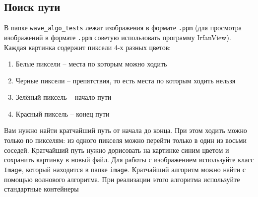 \documentclass{article}
\begin{document}
\subsection{Поиск пути}
В папке \texttt{wave\_algo\_tests} лежат изображения в формате \texttt{.ppm} (для просмотра изображений в формате \texttt{.ppm} советую использовать программу IrfanView).  Каждая картинка содержит пиксели 4-х разных цветов:
\begin{enumerate}
\item Белые пиксели -- места по которым можно ходить
\item Черные пиксели -- препятствия, то есть места по которым ходить нельзя
\item Зелёный пиксель -- начало пути
\item Красный пиксель -- конец пути
\end{enumerate}
Вам нужно найти кратчайший путь от начала до конца. При этом ходить можно только по пикселям: из одного пикселя можно перейти только в один из восьми соседей.
Кратчайший путь нужно дорисовать на картинке синим цветом и сохранить картинку в новый файл. 
Для работы с изображением используйте класс \texttt{Image}, который находится в папке \texttt{image}.
Кратчайший алгоритм можно найти с помощью волнового алгоритма. При реализации этого алгоритма используйте стандартные контейнеры
\end{document}
